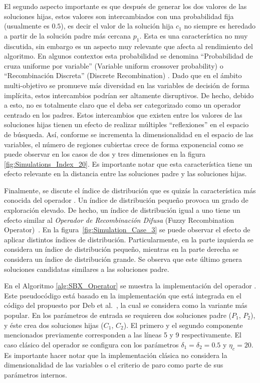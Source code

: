 El segundo aspecto importante es que después de generar los dos valores de las soluciones hijas, estos valores son intercambiados con una probabilidad fija 
(usualmente es $0.5$), es decir el valor de la solución hija $c_1$ no siempre es heredado a partir de la solución padre más cercana $p_1$.
%
Esta es una característica no muy discutida, sin embargo es un aspecto muy relevante que afecta al rendimiento del algoritmo.
%
En algunos contextos esta probabilidad se denomina ``Probabilidad de cruza uniforme por variable'' (Variable uniform crossover probability) \cite{tuvsar2007differential} 
o ``Recombinación Discreta'' (Discrete Recombination) \cite{muhlenbein1993predictive}.
%
Dado que en el ámbito multi-objetivo se promueve más diversidad en las variables de decisión de forma implícita, estos intercambios podrían ser altamente disruptivos.
%
De hecho, debido a esto, no es totalmente claro que el \SBX{} deba ser categorizado como un operador centrado en los padres.
%
Estos intercambios que existen entre los valores de las soluciones hijas tienen un efecto de realizar múltiples ``reflexiones'' en el espacio de búsqueda.
%
Así, conforme se incrementa la dimensionalidad en el espacio de las variables, el número de regiones cubiertas crece de forma exponencial como se puede observar en 
los casos de dos y tres dimensiones en la figura \ref{fig:Simulations_Index_20}.
%
Es importante notar que esta característica tiene un efecto relevante en la distancia entre las soluciones padre y las soluciones hijas.

Finalmente, se discute el índice de distribución que es quizás la característica más conocida del operador \SBX{}.
%
Un índice de distribución pequeño provoca un grado de exploración elevado.
%
De hecho, un índice de distribución igual a uno tiene un efecto similar al \textit{Operador de Recombinación Difusa} (Fuzzy Recombination Operator)~\cite{voigt1995fuzzy}.
%
En la figura~\ref{fig:Simulation_Case_3} se puede observar el efecto de aplicar distintos índices de distribución.
%
Particularmente, en la parte izquierda se considera un índice de distribución pequeño, mientras en la parte derecha se considera un índice de distribución grande.
%
Se observa que este último genera soluciones candidatas similares a las soluciones padre.

En el Algoritmo \ref{alg:SBX_Operator} se muestra la implementación del operador \SBX{}.
%
Este pseudocódigo está basado en la implementación que está integrada en el código del \NSGAII{} propuesto por Deb et al.~\cite{Joel:NSGAII}, 
la cual se considera como la variante más popular.
%
En los parámetros de entrada se requieren dos soluciones padre ($P_1$, $P_2$), y éste crea dos soluciones hijas ($C_1$, $C_2$).
%
El primero y el segundo componente mencionados previamente corresponden a las líneas 5 y 9 respectivamente.
%
El caso clásico del operador \SBX{} se configura con los parámetros $\delta_1 = \delta_2 = 0.5$ y $\eta_c = 20$.
%
Es importante hacer notar que la implementación clásica no considera la dimensionalidad de las variables o el criterio de paro como parte de sus parámetros internos.

